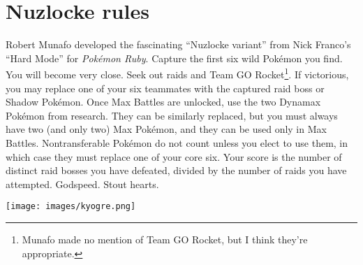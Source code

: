 \section{Nuzlocke rules}
Robert Munafo developed the fascinating ``Nuzlocke variant'' from Nick Franco's ``Hard Mode''
 for \textit{Pokémon Ruby}.
Capture the first six wild Pokémon you find.
You will become very close.
Seek out raids and Team GO Rocket\footnote{Munafo made no mention of Team GO Rocket, but I think they're appropriate.}.
If victorious, you may replace one of your six teammates with the captured raid boss or Shadow Pokémon.
Once Max Battles are unlocked, use the two Dynamax Pokémon from research.
They can be similarly replaced, but you must always have two (and only two) Max Pokémon, and they can be used only in Max Battles.
Nontransferable Pokémon do not count unless you elect to use them, in which case they
 must replace one of your core six.
Your score is the number of distinct raid bosses you have defeated, divided by the number of raids you have attempted.
Godspeed. Stout hearts.

\vfill\texttt{[image: images/kyogre.png]}\vfill

